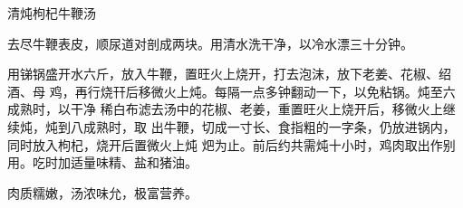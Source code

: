 \begin{recipe}{清炖枸杞牛鞭汤}

\ingredients



\preparation

去尽牛鞭表皮，顺尿道对剖成两块。用清水洗干净，以冷水漂三十分钟。

用锑锅盛开水六斤，放入牛鞭，置旺火上烧开，打去泡沫，放下老姜、花椒、绍酒、母
鸡，再行烧幵后移微火上炖。每隔一点多钟翻动一下，以免粘锅。炖至六成熟时，以干净
稀白布滤去汤中的花椒、老姜，重置旺火上烧开后，移微火上继续炖，炖到八成熟时，取
出牛鞭，切成一寸长、食指粗的一字条，仍放进锅内，同时放入枸杞，烧开后置微火上炖
𤆵为止。前后约共需炖十小时，鸡肉取出作别用。吃时加适量味精、盐和猪油。

\features

肉质糯嫩，汤浓味允，极富营养。

\end{recipe}

